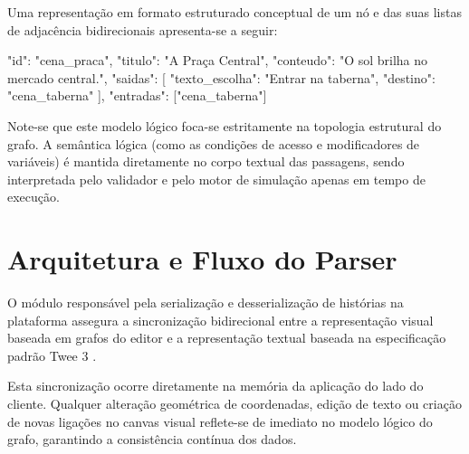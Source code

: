 Uma representação em formato estruturado conceptual de um nó e das suas listas de adjacência bidirecionais apresenta-se a seguir:

\begin{code}
{
  "id": "cena_praca",
  "titulo": "A Praça Central",
  "conteudo": "O sol brilha no mercado central.",
  "saidas": [
    { "texto_escolha": "Entrar na taberna", "destino": "cena_taberna" }
  ],
  "entradas": ["cena_taberna"]
}
\end{code}

Note-se que este modelo lógico foca-se estritamente na topologia estrutural do grafo. A semântica lógica (como as condições de acesso e modificadores de variáveis) é mantida diretamente no corpo textual das passagens, sendo interpretada pelo validador e pelo motor de simulação apenas em tempo de execução.

\section{Arquitetura e Fluxo do Parser}
\label{sec:arquitetura-parser-sincrono}

O módulo responsável pela serialização e desserialização de histórias na plataforma assegura a sincronização bidirecional entre a representação visual baseada em grafos do editor e a representação textual baseada na especificação padrão Twee 3 \citep{Twee3Reference}.

Esta sincronização ocorre diretamente na memória da aplicação do lado do cliente. Qualquer alteração geométrica de coordenadas, edição de texto ou criação de novas ligações no canvas visual reflete-se de imediato no modelo lógico do grafo, garantindo a consistência contínua dos dados.


